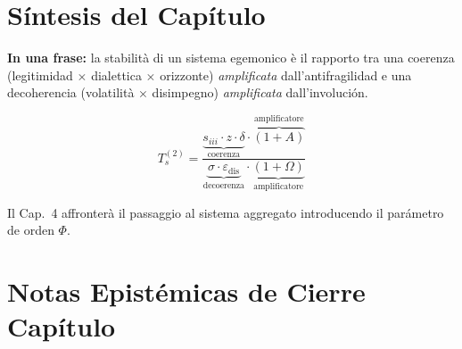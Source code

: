 \section{Síntesis del Capítulo}\label{sintesi-del-capítulo}

\Proved{} \textbf{In una frase:} la stabilità di un sistema egemonico è
il rapporto tra una coerenza (legitimidad $\times$ dialettica $\times$ orizzonte)
\emph{amplificata} dall'antifragilidad e una decoherencia (volatilità $\times$
disimpegno) \emph{amplificata} dall'involución.

\[
T_s^{(2)} = \frac{\underbrace{s_{iii} \cdot z \cdot \delta}_{\text{coerenza}} \cdot \overbrace{(1+A)}^{\text{amplificatore}}}{\underbrace{\sigma \cdot \varepsilon_{\text{dis}}}_{\text{decoerenza}} \cdot \underbrace{(1+\Omega)}_{\text{amplificatore}}}
\]

Il Cap.~4 affronterà il passaggio al sistema aggregato introducendo il
parámetro de orden \(\Phi\).



\section{Notas Epistémicas de Cierre
Capítulo}\label{note-epistemiche-di-chiusura-capítulo}

